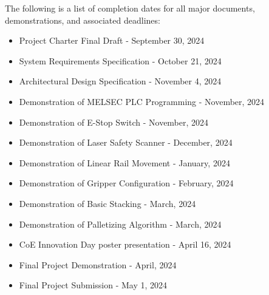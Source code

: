 The following is a list of completion dates for all major documents, demonstrations, and associated deadlines:
\begin{itemize}
  \item Project Charter Final Draft             - September 30, 2024
  \item System Requirements Specification       - October   21, 2024
  \item Architectural Design Specification      - November   4, 2024
  \item Demonstration of MELSEC PLC Programming - November,     2024
  \item Demonstration of E-Stop Switch          - November,     2024
  \item Demonstration of Laser Safety Scanner   - December,     2024
  \item Demonstration of Linear Rail Movement   - January,      2024
  \item Demonstration of Gripper Configuration  - February,     2024
  \item Demonstration of Basic Stacking         - March,        2024
  \item Demonstration of Palletizing Algorithm  - March,        2024
  \item CoE Innovation Day poster presentation  - April     16, 2024
  \item Final Project Demonstration             - April,        2024    
  \item Final Project Submission                - May        1, 2024
\end{itemize}

